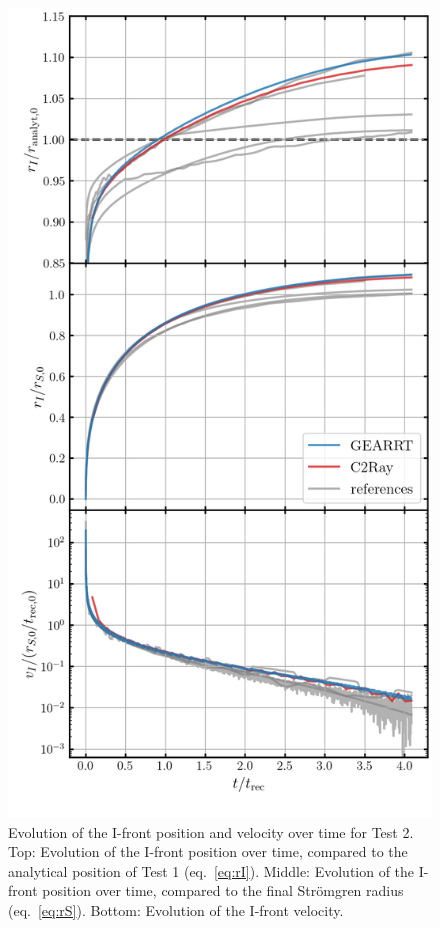 \begin{figure}
 \centering
 \includegraphics[width=.7\textwidth]{figures/RHD/Iliev2/ionization_fronts.png}%
 \caption{
 Evolution of the I-front position and velocity over time for Test 2.
 Top: Evolution of the I-front position over time, compared to the analytical position of Test 1
(eq.~\ref{eq:rI}).
 Middle: Evolution of the I-front position over time, compared to the final Str\"omgren radius
(eq.~\ref{eq:rS}).
 Bottom: Evolution of the I-front velocity.
 }
 \label{fig:iliev2-Ifront}
\end{figure}


